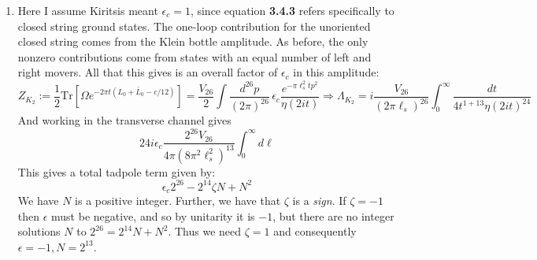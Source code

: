 \documentclass[11pt, class=article, crop=false]{standalone}
\begin{document}
\begin{enumerate}
	\item Here I assume Kiritsis meant $\epsilon_c = 1$, since equation \textbf{3.4.3} refers specifically to closed string ground states. The one-loop contribution for the unoriented closed string comes from the Klein bottle amplitude. 	As before, the only nonzero contributions come from states with an equal number of left and right movers. All that this gives is an overall factor of $\epsilon_c$ in this amplitude:
	\[
		Z_{K_2} := \frac12 \mathrm{Tr}[\Omega e^{-2\pi t (L_0 + \bar L_0 - c/12)}] =  \frac{V_{26}}{2} \int \frac{d^{26} p}{(2\pi)^{26}}\, \epsilon_c \frac{e^{-\pi \ell_s^2 t p^2}}{\eta(2 i t)} \Rightarrow \Lambda_{K_2} = i \frac{V_{26}}{(2\pi \ell_s)^{26}} \int_0^\infty \frac{dt}{4t^{1+13} \eta(2 i t)^{24}}
	\]
	And working in the transverse channel gives
	\[
		24 i \epsilon_c \frac{2^{26} V_{26}}{4 \pi (8\pi^2 \ell_s^2)^{13}} \int_0^\infty d\ell
	\]
	This gives a total tadpole term given by:
	\[
		\epsilon_c 2^{26} - 2^{14} \zeta N + N^2
	\]
	We have $N$ is a positive integer. Further, we have that $\zeta$ is a \emph{sign}. If $\zeta = -1$ then $\epsilon$ must be negative, and so by unitarity it is $-1$, but there are no integer solutions $N$ to $2^{26} = 2^{14} N + N^2$. Thus we need $\zeta = 1$ and consequently $\epsilon = -1, N = 2^{13}$.

\end{enumerate}

	
\end{document}
